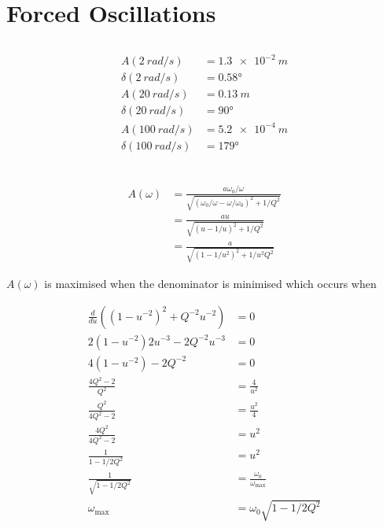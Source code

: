 \documentclass{article}
\begin{document}
\section{Forced Oscillations}

\subsection{}

\begin{align*}
  A(\qty{2}{rad / s})      & = \qty{1.3e-2}{m} \\
  \delta(\qty{2}{rad/s})   & = \ang{0.58}      \\
  A(\qty{20}{rad / s})     & = \qty{0.13}{m}   \\
  \delta(\qty{20}{rad/s})  & = \ang{90}        \\
  A(\qty{100}{rad / s})    & = \qty{5.2e-4}{m} \\
  \delta(\qty{100}{rad/s}) & = \ang{179}       \\
\end{align*}

\subsection{}

\begin{align*}
  A(\omega) & = \frac{a \omega_0 / \omega}{\sqrt{(\omega_0 / \omega - \omega / \omega_0)^2 + 1 / Q^2}} \\
            & = \frac{a u}{\sqrt{(u - 1 / u)^2 + 1 / Q^2}}                                             \\
            & = \frac{a}{\sqrt{(1 - 1 / u^2)^2 + 1 / u^2 Q^2}}
\end{align*}

$A(\omega)$ is maximised when the denominator is minimised which occurs when

\begin{align*}
  \frac{d}{d u} ((1 - u^{-2})^2 + Q^{-2} u^{-2}) & = 0                                  \\
  2 (1 - u^{-2}) 2 u^{-3} - 2 Q^{-2} u^{-3}      & = 0                                  \\
  4 (1 - u^{-2}) - 2 Q^{-2}                      & = 0                                  \\
  \frac{4 Q^2 - 2}{Q^2}                          & = \frac{4}{u^2}                      \\
  \frac{Q^2}{4 Q^2 - 2}                          & = \frac{u^2}{4}                      \\
  \frac{4 Q^2}{4 Q^2 - 2}                        & = u^2                                \\
  \frac{1}{1 - 1 / 2 Q^2}                        & = u^2                                \\
  \frac{1}{\sqrt{1 - 1 / 2 Q^2}}                 & = \frac{\omega_0}{\omega_\text{max}} \\
  \omega_\text{max}                              & = \omega_0 \sqrt{1 - 1 / 2 Q^2}
\end{align*}
\end{document}
